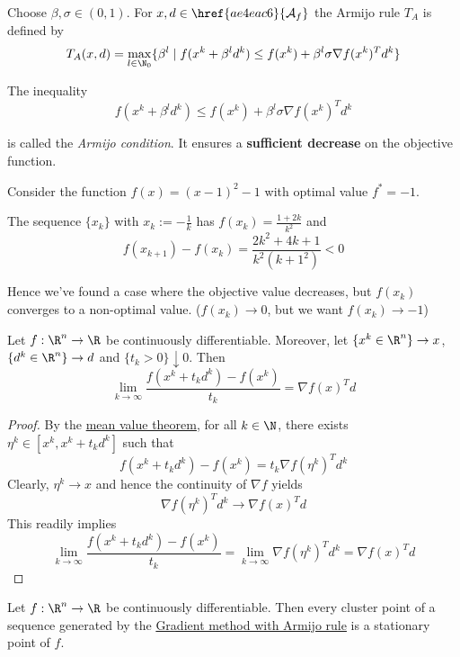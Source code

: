 \label{fefb024}

Choose $\beta,\sigma\in(0,1)$. For $x,d\in\href{ae4eac6}{\mathcal A_f}$ the
Armijo rule $T_A$ is defined by
$$
  T_A(x,d)=\max_{l\in\N_0}\{\beta^l\mid f(x^k+\beta^ld^k)\leq
  f(x^k)+\beta^l\sigma\nabla f(x^k)^Td^k\}
$$

The inequality
$$
  f(x^k+\beta^ld^k)\leq f(x^k)+\beta^l\sigma\nabla f(x^k)^Td^k
$$

is called the \textit{Armijo condition}. It ensures a \textbf{sufficient
decrease} on the objective function.

\label{ae7f42d}

Consider the function $f(x)=(x-1)^2-1$ with optimal value $f^*=-1$.

The sequence $\{x_k\}$ with $x_k:=-\frac1k$ has $f(x_k)=\frac{1+2k}{k^2}$ and
$$
  f(x_{k+1})-f(x_k)=\frac{2k^2+4k+1}{k^2(k+1^2)}<0
$$

Hence we've found a case where the objective value decreases, but $f(x_k)$
converges to a non-optimal value. ($f(x_k)\to0$, but we want $f(x_k)\to-1$)

\label{f8e1f12}

Let $f:\R^n\to\R$ be continuously differentiable. Moreover, let
$\{x^k\in\R^n\}\to x$, $\{d^k\in\R^n\}\to d$ and $\{t_k>0\}\downarrow0$. Then
$$
  \lim_{k\to\infty}\frac{f(x^k+t_kd^k)-f(x^k)}{t_k}=\nabla f(x)^Td
$$

\begin{proof}
  By the \href{d37aa2b}{mean value theorem}, for all $k\in\N$, there
  exists $\eta^k\in[x^k,x^k+t_kd^k]$ such that
  $$
    f(x^k+t_kd^k)-f(x^k)=t_k\nabla f(\eta^k)^Td^k
  $$
  Clearly, $\eta^k\to x$ and hence the continuity of $\nabla f$ yields
  $$
    \nabla f(\eta^k)^Td^k\to\nabla f(x)^Td
  $$
  This readily implies
  $$
    \lim_{k\to\infty}\frac{f(x^k+t_kd^k)-f(x^k)}{t_k}=
    \lim_{k\to\infty}\nabla f(\eta^k)^Td^k=
    \nabla f(x)^Td
  $$
\end{proof}

\label{bbb25cd}

Let $f:\R^n\to\R$ be continuously differentiable. Then every cluster point of a
sequence generated by the \href{ae01f6d}{Gradient method with Armijo rule} is a
stationary point of $f$.

